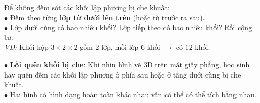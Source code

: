 \documentclass[14pt,a4paper,oneside]{extbook}
\begin{document}
\vspace{3mm}

\noindent
\begin{minipage}[t]{0.54\textwidth}
  \begin{tcolorbox}[
    enhanced,
    title={\footnotesize\bfseries\color{white}\faCubes\ Kỹ thuật đếm khối lập phương theo lớp},
    colback=green!3!white,
    colframe=green!60!black,
    arc=2.5mm, boxrule=0.8pt, top=1.8mm, bottom=1.8mm, left=2.2mm, right=2.2mm
  ]
    \footnotesize
    Để không đếm sót các khối lập phương bị che khuất:\\
    $\bullet$ Đếm theo từng \textbf{lớp từ dưới lên trên} (hoặc từ trước ra sau).\\
    $\bullet$ Lớp dưới cùng có bao nhiêu khối? Lớp tiếp theo có bao nhiêu khối? Rồi cộng lại.\\
    \textit{VD:} Khối hộp $3 \times 2 \times 2$ gồm $2$ lớp, mỗi lớp $6$ khối $\rightarrow$ có $12$ khối.
  \end{tcolorbox}
\end{minipage}%
\hfill
\begin{minipage}[t]{0.44\textwidth}
  \begin{tcolorbox}[
    enhanced,
    title={\footnotesize\bfseries\color{white}\faExclamationTriangle\ Mẹo tránh bẫy trắc nghiệm},
    colback=red!2!white,
    colframe=red!70!black,
    arc=2.5mm, boxrule=0.8pt, top=1.8mm, bottom=1.8mm, left=2.2mm, right=2.2mm
  ]
    \footnotesize
    $\bullet$ \textbf{Lỗi quên khối bị che}: Khi nhìn hình vẽ 3D trên mặt giấy phẳng, học sinh hay quên đếm các khối lập phương ở phía sau hoặc ở tầng dưới cùng bị che khuất.\\
    $\bullet$ Hai hình có hình dạng hoàn toàn khác nhau vẫn có thể có thể tích bằng nhau.
  \end{tcolorbox}
\end{minipage}
\end{document}
